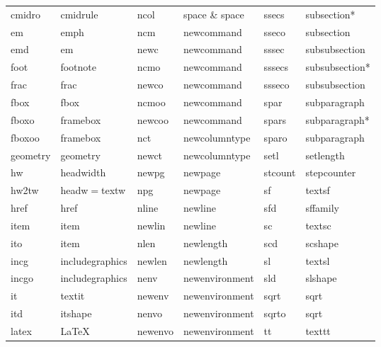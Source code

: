 \documentclass[11pt]{article}
\begin{document}
\begin{table}[!h]
{\begin{tabular}{llllll}
cmidro           & cmidrule          & ncol       & space \& space & ssecs           & subsection* \\
em               & emph              & ncm        & newcommand     & sseco           & subsection \\ 
emd              & em                & newc       & newcommand     & sssec           & subsubsection \\
foot             & footnote          & ncmo       & newcommand     & sssecs          & subsubsection* \\
frac             & frac              & newco      & newcommand     & ssseco          & subsubsection \\
fbox             & fbox              & ncmoo      & newcommand     & spar            & subparagraph \\
fboxo            & framebox          & newcoo     & newcommand     & spars           & subparagraph* \\
fboxoo           & framebox          & nct        & newcolumntype  & sparo           & subparagraph \\
geometry         & geometry          & newct      & newcolumntype  & setl            & setlength \\
hw               & headwidth         & newpg      & newpage        & stcount         & stepcounter \\
hw2tw            & headw\(=\)textw   & npg        & newpage        & sf              & textsf \\
href             & href              & nline      & newline        & sfd             & sffamily \\
item             & item              & newlin     & newline        & sc              & textsc \\
ito              & item              & nlen       & newlength      & scd             & scshape \\
incg             & includegraphics   & newlen     & newlength      & sl              & textsl \\
incgo            & includegraphics   & nenv       & newenvironment & sld             & slshape \\
it               & textit            & newenv     & newenvironment & sqrt            & sqrt \\
itd              & itshape           & nenvo      & newenvironment & sqrto           & sqrt \\
latex            & LaTeX             & newenvo    & newenvironment & tt              & texttt \\

\end{tabular}}
\end{table}
\end{document}
